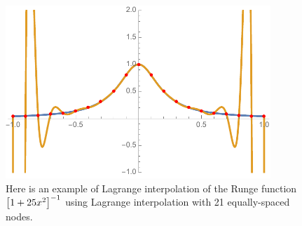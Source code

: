 \begin{figure}[t]
\centering
\includegraphics[width=10cm]{plots/runge_phenomenon.pdf}
\caption[Example of the Runge phenomenon]{
Here is an example of Lagrange interpolation of the Runge function
$\left[ 1+25x^{2} \right]^{-1}$ using Lagrange interpolation
with 21 equally-spaced nodes.}
\label{fig:intro_runge_plot}
\end{figure}
